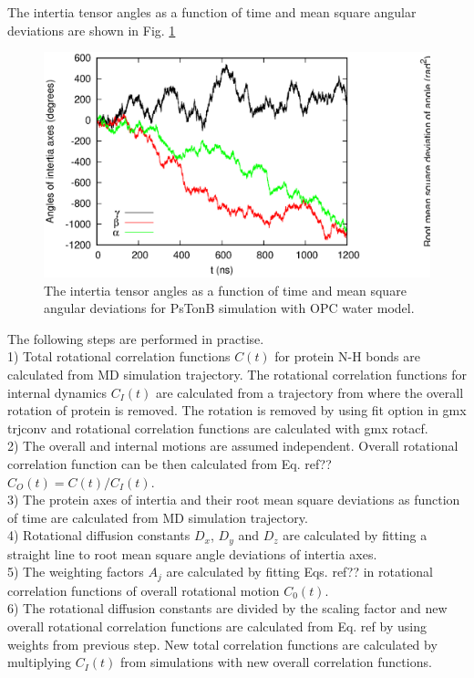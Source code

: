 \documentclass[pre,aps,floatfix,authordate1-4]{revtex4-1}
\begin{document}
The intertia tensor angles as a function of time and mean square angular
deviations are shown in Fig. \ref{exampleROTDIFFcalc}
\begin{figure}[!h]
  \includegraphics[width=18cm]{../Figs/exampleROTDIFFcalc.eps}%
  \caption{The intertia tensor angles as a function of time and mean square angular
    deviations for PsTonB simulation with OPC water model.
    \label{exampleROTDIFFcalc}}%
\end{figure}

The following steps are performed in practise. \\
1) Total rotational correlation functions $C(t)$ for protein N-H bonds are calculated from
MD simulation trajectory. The rotational correlation functions for internal dynamics $C_I(t)$ are
calculated from a trajectory from where the overall rotation of protein
is removed. The rotation is removed by using fit option in gmx trjconv and rotational
correlation functions are calculated with gmx rotacf. \\
2) The overall and internal motions are assumed independent. Overall
rotational correlation function can be then calculated from Eq. ref{??}
$C_O(t)=C(t)/C_I(t)$. \\
3) The protein axes of intertia and their root mean square deviations as function of
time are calculated from MD simulation trajectory. \\
4) Rotational diffusion constants $D_x$, $D_y$ and $D_z$ are calculated by fitting a straight line
to root mean square angle deviations of intertia axes. \\
5) The weighting factors $A_j$ are calculated by fitting Eqs. ref{??} in
rotational correlation functions of overall rotational motion $C_0(t)$. \\
6) The rotational diffusion constants are divided by the scaling factor and new
overall rotational correlation functions are calculated from Eq. ref {} by using
weights from previous step. New total correlation functions are calculated by
multiplying $C_I(t)$ from simulations with new overall correlation functions.
\end{document}
